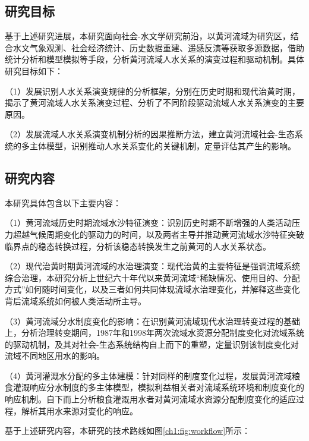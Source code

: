 
\subsection{研究目标}
基于上述研究进展，本研究面向社会-水文学研究前沿，以黄河流域为研究区，结合水文气象观测、社会经济统计、历史数据重建、遥感反演等获取多源数据，借助统计分析和模型模拟等手段，分析黄河流域人水关系的演变过程和驱动机制。具体研究目标如下：

（1）发展识别人水关系演变规律的分析框架，分别在历史时期和现代治黄时期，揭示了黄河流域人水关系演变过程、分析了不同阶段驱动流域人水关系演变的主要原因。

（2）发展流域人水关系演变机制分析的因果推断方法，建立黄河流域社会-生态系统的多主体模型，识别推动人水关系变化的关键机制，定量评估其产生的影响。


\subsection{研究内容}

本研究具体包含以下主要内容：

（1）黄河流域历史时期流域水沙特征演变：识别历史时期不断增强的人类活动压力超越气候周期变化的驱动力的时间，以及两者主导并推动黄河流域水沙特征突破临界点的稳态转换过程，分析该稳态转换发生之前黄河的人水关系状态。

（2）现代治黄时期黄河流域的水治理演变：现代治黄的主要特征是强调流域系统综合治理，本研究分析上世纪六十年代以来黄河流域“稀缺情况、使用目的、分配方式”如何随时间变化，以及三者如何共同体现流域水治理变化，并解释这些变化背后流域系统如何被人类活动所主导。

（3）黄河流域分水制度变化的影响：在识别黄河流域现代水治理转变过程的基础上，分析治理转变期间，1987年和1998年两次流域水资源分配制度变化对流域系统的驱动机制，及其对社会-生态系统结构自上而下的重塑，定量识别该制度变化对流域不同地区用水的影响。

（4）黄河灌溉水分配的多主体建模：针对同样的制度变化过程，发展黄河流域粮食灌溉响应分水制度的多主体模型，模拟利益相关者对流域系统环境和制度变化的响应机制。自下而上分析粮食灌溉用水者对黄河流域水资源分配制度变化的适应过程，解析其用水来源对变化的响应。

基于上述研究内容，本研究的技术路线如图\ref{ch1:fig:workflow}所示：

